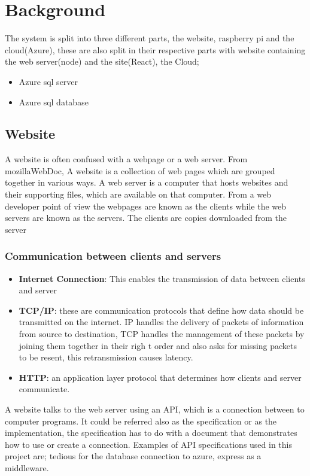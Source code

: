 \chapter{Background}
The system is split into three different parts, the website, raspberry pi and the cloud(Azure), these are also split in their respective parts with website containing the web server(node) and the site(React), the Cloud; 
\begin{itemize}
  \item Azure sql server
  \item Azure sql database
\end{itemize}
\section{Website}
A website is often confused with a webpage or a web server. From mozillaWebDoc, A website is a collection of web pages which are grouped together in various ways. A web server is a computer that hosts websites and their supporting files, which are available on that computer. From a web developer point of view the webpages are known as the clients while the web servers are known as the servers. The clients are copies downloaded from the server


\subsection{Communication between clients and servers}
\begin{itemize}
  \item \textbf{Internet Connection}: This enables the transmission of data between clients and server
  \item \textbf{TCP/IP}: these are communication protocols that define how data should be transmitted on the internet. IP handles the delivery of packets of information from source to destination, TCP handles the management of these packets by joining them together in their righ t order and also asks for missing packets to be resent, this retransmission causes latency. 
  \item \textbf{HTTP}: an application layer protocol that determines how clients and server communicate.
\end{itemize}

A website talks to the web server using an API, which is a connection between to computer programs. It could be referred also as the specification or as the implementation, the specification has to do with a document that demonstrates how to use or create a connection. Examples of API specifications used in this project are; tedious for the database connection to azure, express as a middleware. 

